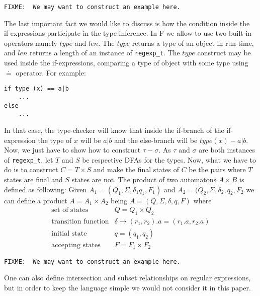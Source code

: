 \documentclass{article}
\begin{document}
\noindent
\verb|FIXME:  We may want to construct an example here.|


The last important fact we would like to discuss is how the
condition inside the if-expressions participate in the 
type-inference.  In F we allow to use two built-in operators
namely $type$ and $len$.  The $type$ returns a type of an object
in run-time, and $len$ returns a length of an instance of
\texttt{regexp\_t}.  The $type$ construct may be used inside
the if-expressions, comparing a type of object with some type
using $\doteq$ operator.  For example:
\begin{verbatim}
if type (x) == a|b
    ...
else
    ...
\end{verbatim}
In that case, the type-checker will know that inside the if-branch
of the if-expression the type of $x$ will be $a|b$
and the else-branch will be $type (x) - a|b$.  Now, we just have to
show how to construct $\tau - \sigma$.  As $\tau$ and $\sigma$ are 
both instances of \texttt{regexp\_t}, let $T$ and $S$  be 
respective DFAs for the types.  Now, what we have to do is to 
construct $C = T \times S$ and make the final states of $C$ be
the pairs where $T$ states are final and $S$ states are not.  The
product of two automatons $A \times B$ is defined as following:
Given $A_1 = (Q_1, \Sigma, \delta_1 q_1, F_1)$ and 
$A_2 = (Q_2, \Sigma, \delta_2, q_2, F_2$ we can define a product
$A = A_1 \times A_2$ being $A = (Q, \Sigma, \delta, q, F)$ where
\begin{eqnarray}
    \textrm{set of states} & Q = Q_1 \times Q_2 \\
    \textrm{transition function} & 
        \delta \rightarrow (r_1, r_2).a = (r_1.a, r_2.a) \\
    \textrm{initial state} & q = (q_1, q_2) \\
    \textrm{accepting states} & F = F_1 \times F_2
\end{eqnarray}

\noindent
\verb|FIXME:  We may want to construct an example here.|

One can also define intersection and subset relationships on
regular expressions, but in order to keep the language simple
we would not consider it in this paper.
\end{document}
